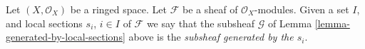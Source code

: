 \begin{definition}
\label{definition-generated-by-local-sections}
Let $(X, \mathcal{O}_X)$ be a ringed space.
Let $\mathcal{F}$ be a sheaf of $\mathcal{O}_X$-modules.
Given a set $I$, and
local sections $s_i$, $i \in I$ of $\mathcal{F}$
we say that the subsheaf $\mathcal{G}$ of
Lemma \ref{lemma-generated-by-local-sections}
above is the {\it subsheaf generated by the $s_i$}.
\end{definition}